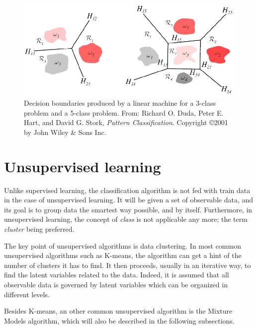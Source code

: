 \begin{figure}[!h]
\begin{center}
\noindent \includegraphics[scale=0.5]{figures/lda_k_disc} 
\newline
\caption{Decision boundaries produced by a linear machine for a 3-class problem and a 5-class problem. From: Richard O. Duda, Peter E. Hart, and David G. Stork, \textit{Pattern Classification}. Copyright \copyright  2001 by John Wiley \& Sons Inc.}
\label{k_disc}
\end{center} 
\end{figure}

\section{Unsupervised learning}

\vspace{\baselineskip}
\noindent Unlike supervised learning, the classification algorithm is not fed with train data in the case of unsupervised learning. It will be given a set of observable data, and its goal is to group data the smartest way possible, and by itself. Furthermore, in unsupervised learning, the concept of \textit{class} is not applicable any more; the term \textit{cluster} being preferred.
\newline

\noindent The key point of unsupervised algorithms is data clustering. In most common unsupervised algorithms such as K-means, the algorithm can get a hint of the number of clusters it has to find. It then proceeds, usually in an iterative way, to find the latent variables related to the data. Indeed, it is assumed that all observable data is governed by latent variables which can be organized in different levels.
\newline

\noindent Besides K-means, an other common unsupervised algorithm is the Mixture Models algorithm, which will also be described in the following subsections.
\newline

